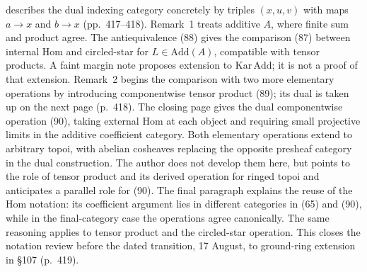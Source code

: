 \documentclass[10pt,oneside]{book}
\begin{document}
describes the dual indexing category concretely by triples $(x,u,v)$ with maps $a\to x$ and $b\to x$ (pp.\ 417--418). Remark~1 treats additive $A$, where finite sum and product agree. The antiequivalence (88) gives the comparison (87) between internal Hom and circled-star for $L\in\mathrm{Add}(A)$, compatible with tensor products. A faint margin note proposes extension to $\mathrm{Kar}\,\mathrm{Add}$; it is not a proof of that extension. Remark~2 begins the comparison with two more elementary operations by introducing componentwise tensor product (89); its dual is taken up on the next page (p.\ 418). The closing page gives the dual componentwise operation (90), taking external Hom at each object and requiring small projective limits in the additive coefficient category. Both elementary operations extend to arbitrary topoi, with abelian cosheaves replacing the opposite presheaf category in the dual construction. The author does not develop them here, but points to the role of tensor product and its derived operation for ringed topoi and anticipates a parallel role for (90). The final paragraph explains the reuse of the Hom notation: its coefficient argument lies in different categories in (65) and (90), while in the final-category case the operations agree canonically. The same reasoning applies to tensor product and the circled-star operation. This closes the notation review before the dated transition, 17 August, to ground-ring extension in \S107 (p.\ 419).
\end{document}
